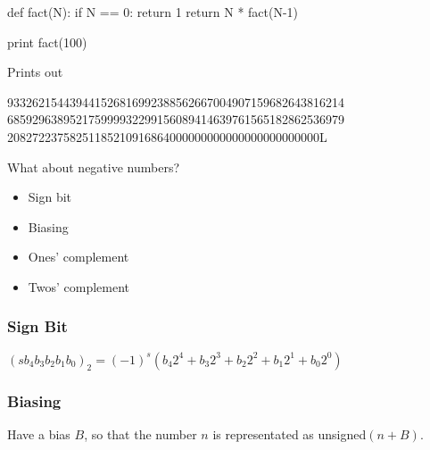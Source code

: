 \begin{frame}[fragile]
\begin{python}
def fact(N):
     if N == 0: return 1
     return N * fact(N-1)

print  fact(100)
\end{python}

Prints out

933262154439441526816992388562667004907159682643816214\\
685929638952175999932299156089414639761565182862536979\\
20827223758251185210916864000000000000000000000000L

\end{frame}

\begin{frame}[fragile]
{}
What about negative numbers?

\end{frame}

\begin{frame}[fragile]

\begin{itemize}
\item Sign bit
\item Biasing
\item Ones' complement
\item Twos' complement
\end{itemize}
\end{frame}

\begin{frame}[fragile]
\frametitle{Sign Bit}

$(s b_4 b_3 b_2 b_1 b_0)_2 = (-1)^s \left(b_4 2^4 + b_3 2^3 + b_2 2^2 + b_1 2^1 + b_0 2^0 \right)$

\end{frame}

\begin{frame}[fragile]
\frametitle{Biasing}

Have a bias $B$, so that the number $n$ is representated as unsigned$(n+B)$.

\end{frame}

